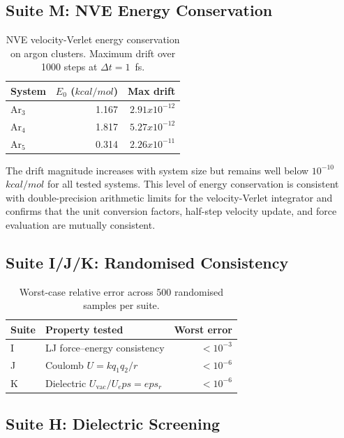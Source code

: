 \documentclass[11pt,twoside]{article}
\def\times{x}%
\def\varepsilon{eps}%
\def\kcalmol{kcal/mol}%
\newcommand{\kcalmol}{\text{kcal/mol}}
\begin{document}
\subsection{Suite M: NVE Energy Conservation}

\begin{table}[H]
\centering
\caption{NVE velocity-Verlet energy conservation on argon clusters. Maximum drift over 1000 steps at $\Delta t = 1$~fs.}
\label{tab:nve-results}
\begin{tabular}{lrr}
\toprule
\textbf{System} & $E_0$ ($\kcalmol$) & \textbf{Max drift} \\
\midrule
Ar$_3$ & 1.167 & $2.91 \times 10^{-12}$ \\
Ar$_4$ & 1.817 & $5.27 \times 10^{-12}$ \\
Ar$_5$ & 0.314 & $2.26 \times 10^{-11}$ \\
\bottomrule
\end{tabular}
\end{table}

The drift magnitude increases with system size but remains well below $10^{-10}$~$\kcalmol$ for all tested systems. This level of energy conservation is consistent with double-precision arithmetic limits for the velocity-Verlet integrator and confirms that the unit conversion factors, half-step velocity update, and force evaluation are mutually consistent.

\subsection{Suite I/J/K: Randomised Consistency}

\begin{table}[H]
\centering
\caption{Worst-case relative error across 500 randomised samples per suite.}
\label{tab:random-results}
\begin{tabular}{llr}
\toprule
\textbf{Suite} & \textbf{Property tested} & \textbf{Worst error} \\
\midrule
I & LJ force--energy consistency & $< 10^{-3}$ \\
J & Coulomb $U = k q_1 q_2 / r$ & $< 10^{-6}$ \\
K & Dielectric $U_{\mathrm{vac}} / U_\varepsilon = \varepsilon_r$ & $< 10^{-6}$ \\
\bottomrule
\end{tabular}
\end{table}

\subsection{Suite H: Dielectric Screening}
\end{document}
